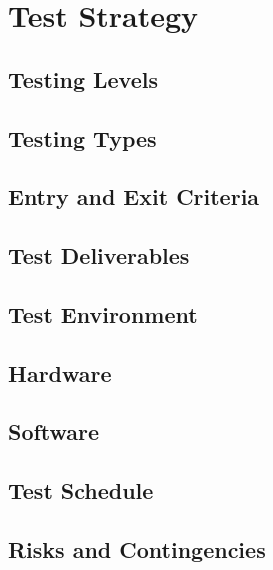 \chapter{Test Strategy}


\section{ Testing Levels}
\section{ Testing Types}
\section{Entry and Exit Criteria}
\section{ Test Deliverables}
\section{Test Environment}
\section{Hardware}
\section{Software}
\section{Test Schedule}
\section{Risks and Contingencies}








